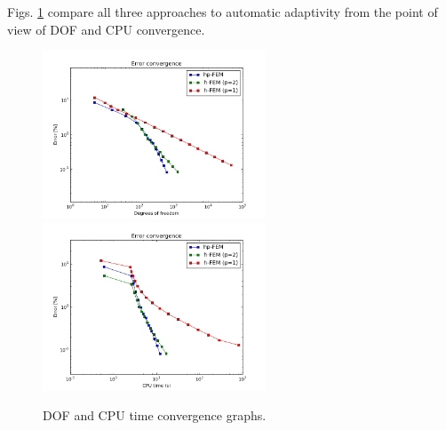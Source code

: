 Figs. \ref{fig:nist-2-conv} compare all
three approaches to automatic adaptivity from the point
of view of DOF and CPU convergence.

\begin{figure}[!ht]
\centering
\includegraphics[height=5cm]{nist/nist-2/conv_dof_aniso.png}\ \
\includegraphics[height=5cm]{nist/nist-2/conv_cpu_aniso.png}
\caption{DOF and CPU time convergence graphs.}
\label{fig:nist-2-conv}
\end{figure}

